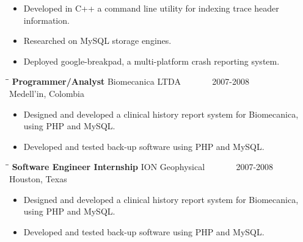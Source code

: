 \documentclass{res}
\begin{document}
\begin{resume}
   \begin{itemize}
       \item Developed in C++ a command line utility for indexing trace header information.
       \item Researched on MySQL storage engines.
       \item Deployed google-breakpad, a multi-platform crash reporting system.
   \end{itemize}

   
   \begin{tabbing}
   \hspace{2.3in}\= \hspace{2.6in}\= \kill %
    {\bf Programmer/Analyst} \>Biomecanica LTDA\> ~~~~~~ 2007-2008\\
                             \>Medell\a'in, Colombia
   \end{tabbing}\vspace{-5pt}      %

   \begin{itemize}
       \item Designed and developed a clinical history report system for Biomecanica, using PHP and MySQL.
       \item Developed and tested back-up software using PHP and MySQL.
   \end{itemize}

   \begin{tabbing}
   \hspace{2.3in}\= \hspace{2.6in}\= \kill %
    {\bf Software Engineer Internship} \> ION Geophysical\> ~~~~~~ 2007-2008\\
                             \>Houston, Texas
   \end{tabbing}\vspace{-5pt}      %
   \begin{itemize}
       \item Designed and developed a clinical history report system for Biomecanica, using PHP and MySQL.
       \item Developed and tested back-up software using PHP and MySQL.
   \end{itemize}


\end{resume}
\end{document}
